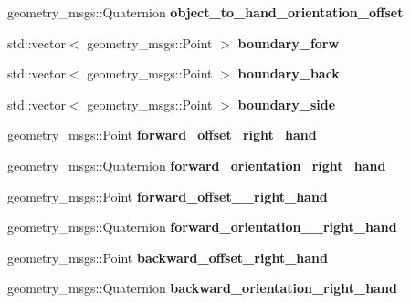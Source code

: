 \begin{DoxyCompactItemize}
geometry\+\_\+msgs\+::\+Quaternion {\bfseries object\+\_\+to\+\_\+hand\+\_\+orientation\+\_\+offset}
\item 
\mbox{\label{structManipulate_ab4c29b0b5cbc588611324cb4664f68ce}} 
std\+::vector$<$ geometry\+\_\+msgs\+::\+Point $>$ {\bfseries boundary\+\_\+forw}
\item 
\mbox{\label{structManipulate_a2b06a2d27e7c0f45e122f746d9e809f8}} 
std\+::vector$<$ geometry\+\_\+msgs\+::\+Point $>$ {\bfseries boundary\+\_\+back}
\item 
\mbox{\label{structManipulate_a2370ef24c3b0f1cfca7bf6b1371e358c}} 
std\+::vector$<$ geometry\+\_\+msgs\+::\+Point $>$ {\bfseries boundary\+\_\+side}
\item 
\mbox{\label{structManipulate_a3dedbb73fa4e16b9c69e2a29abd5a8ea}} 
geometry\+\_\+msgs\+::\+Point {\bfseries forward\+\_\+offset\+\_\+right\+\_\+hand}
\item 
\mbox{\label{structManipulate_a3ba53f05f753139159fc2e160bfbab53}} 
geometry\+\_\+msgs\+::\+Quaternion {\bfseries forward\+\_\+orientation\+\_\+right\+\_\+hand}
\item 
\mbox{\label{structManipulate_a5cdf0c2595ee1d5989d287aeaa79fd04}} 
geometry\+\_\+msgs\+::\+Point {\bfseries forward\+\_\+offset\+\_\+\_\+right\+\_\+hand}
\item 
\mbox{\label{structManipulate_a82fc284404e3652082b57e0587364f6d}} 
geometry\+\_\+msgs\+::\+Quaternion {\bfseries forward\+\_\+orientation\+\_\+\_\+right\+\_\+hand}
\item 
\mbox{\label{structManipulate_a22df486cc5965b64a555116c4d54fa92}} 
geometry\+\_\+msgs\+::\+Point {\bfseries backward\+\_\+offset\+\_\+right\+\_\+hand}
\item 
\mbox{\label{structManipulate_a0bc7078d5bcc5181798be06ee4d7267f}} 
geometry\+\_\+msgs\+::\+Quaternion {\bfseries backward\+\_\+orientation\+\_\+right\+\_\+hand}
\item 
\mbox{\label{structManipulate_a029795563968617a931805e14beac39a}} 

\end{DoxyCompactItemize}
